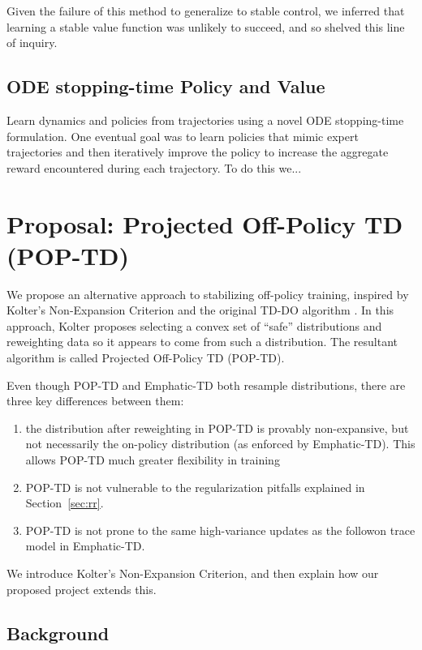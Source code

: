 \documentclass[11pt]{article}
\begin{document}
Given the failure of this method to generalize to stable control, we inferred that learning a stable value function was unlikely to succeed, and so shelved this line of inquiry.

\subsection{ODE stopping-time Policy and Value}

Learn dynamics and policies from trajectories using a novel ODE stopping-time formulation. One eventual goal was to learn policies that mimic expert trajectories and then iteratively improve the policy to increase the aggregate reward encountered during each trajectory. To do this we...

\section{Proposal: Projected Off-Policy TD (POP-TD) }

We propose an alternative approach to stabilizing off-policy training, inspired by Kolter's Non-Expansion Criterion and the original TD-DO algorithm \cite{kolter2011fixed}. 
In this approach, Kolter proposes selecting a convex set of ``safe'' distributions and reweighting data so it appears to come from such a distribution. The resultant algorithm is called Projected Off-Policy TD (POP-TD).

Even though POP-TD and Emphatic-TD both resample distributions, there are three key differences between them:
\begin{enumerate}
  \item the distribution after reweighting in POP-TD is provably non-expansive, but not necessarily the on-policy distribution (as enforced by Emphatic-TD). This allows POP-TD much greater flexibility in training
  \item POP-TD is not vulnerable to the regularization pitfalls explained in Section~\ref{sec:rr}.
  \item POP-TD is not prone to the same high-variance updates as the followon trace model in Emphatic-TD.
\end{enumerate}
We introduce Kolter's Non-Expansion Criterion, and then explain how our proposed project extends this.

\subsection{Background }
\end{document}
